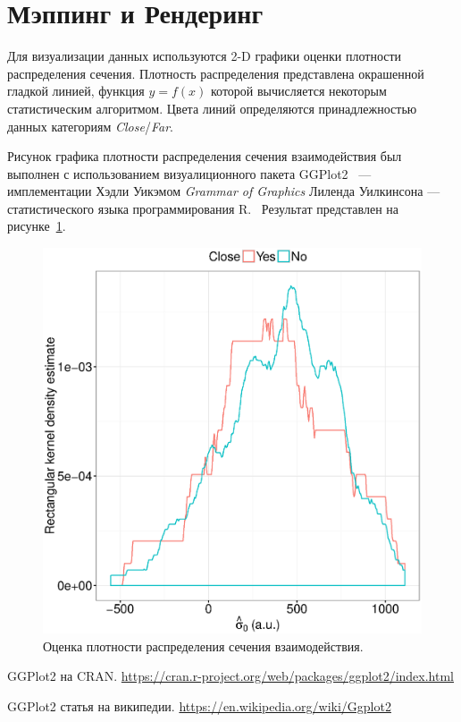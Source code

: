 \documentclass{article}
\begin{document}
	\section{Мэппинг и Рендеринг}
	Для визуализации данных используются 2-D графики оценки плотности распределения сечения. Плотность распределения представлена окрашенной гладкой линией, функция $y = f(x)$ которой вычисляется некоторым статистическим алгоритмом. Цвета линий определяются принадлежностью данных категориям \emph{Close}/\emph{Far}.
	
	Рисунок графика плотности распределения сечения взаимодействия был выполнен с использованием визуалиционного пакета GGPlot2~\cite{GGPlot2} --- имплементации Хэдли  Уикэмом \emph{Grammar of Graphics} Лиленда Уилкинсона --- статистического языка программирования R.~\cite{GGPLOT2_WIKI} Результат представлен на рисунке~\ref{fig:CS0au_dens}.
	
	\begin{figure}[h!]
		\centering
		\includegraphics[scale=.7]{CS0_au_dens.eps}
		\caption{Оценка плотности распределения сечения взаимодействия.\label{fig:CS0au_dens}}
	\end{figure}

	\begin{thebibliography}{9}
		GGPlot2 на CRAN. \url{https://cran.r-project.org/web/packages/ggplot2/index.html}
		
		GGPlot2 статья на википедии. \url{https://en.wikipedia.org/wiki/Ggplot2}
	\end{thebibliography}
	
\end{document}
